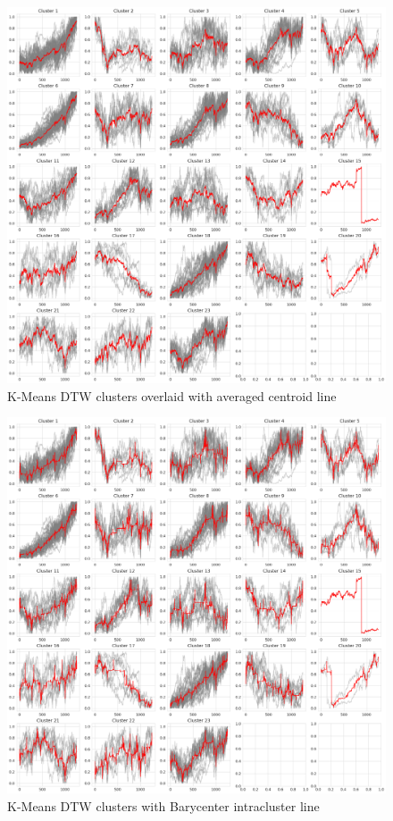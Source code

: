 \documentclass[11pt]{article}
\begin{document}
\begin{figure}[H]
\centering
\includegraphics[width=12cm]{img/kmeands-ts-stocks.png} 
\caption{K-Means DTW clusters overlaid with averaged centroid line}
\label{fig:dtw_kmeans_average}

\end{figure}

\begin{figure}[H]
\centering
\includegraphics[width=12cm]{img/kmeands-ts-stocks-bary.png} 
\caption{K-Means DTW clusters with Barycenter intracluster line}
\label{fig:dtw_kmeans_bary}
\end{figure}
\end{document}
